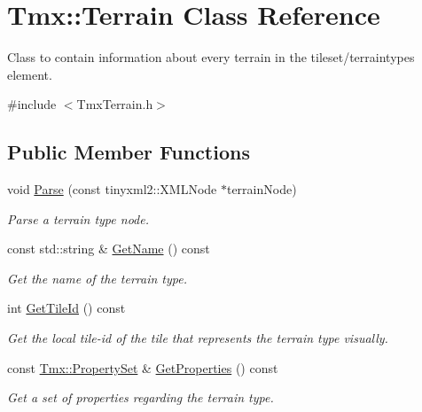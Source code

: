 \hypertarget{classTmx_1_1Terrain}{\section{Tmx\-:\-:Terrain Class Reference}
\label{classTmx_1_1Terrain}
}


Class to contain information about every terrain in the tileset/terraintypes element.  




{\ttfamily \#include $<$Tmx\-Terrain.\-h$>$}

\subsection*{Public Member Functions}
\begin{DoxyCompactItemize}
\item 
\hypertarget{classTmx_1_1Terrain_afe30f92af38023bf56adc2ae8f8e580d}{void \hyperlink{classTmx_1_1Terrain_afe30f92af38023bf56adc2ae8f8e580d}{Parse} (const tinyxml2\-::\-X\-M\-L\-Node $\ast$terrain\-Node)}\label{classTmx_1_1Terrain_afe30f92af38023bf56adc2ae8f8e580d}

\begin{DoxyCompactList}\small\item\em Parse a terrain type node. \end{DoxyCompactList}\item 
\hypertarget{classTmx_1_1Terrain_a623a166c19f3c33d7b80d3c435fdf1ac}{const std\-::string \& \hyperlink{classTmx_1_1Terrain_a623a166c19f3c33d7b80d3c435fdf1ac}{Get\-Name} () const }\label{classTmx_1_1Terrain_a623a166c19f3c33d7b80d3c435fdf1ac}

\begin{DoxyCompactList}\small\item\em Get the name of the terrain type. \end{DoxyCompactList}\item 
\hypertarget{classTmx_1_1Terrain_a20ecd6765c02f84bc51656bf0681bcb6}{int \hyperlink{classTmx_1_1Terrain_a20ecd6765c02f84bc51656bf0681bcb6}{Get\-Tile\-Id} () const }\label{classTmx_1_1Terrain_a20ecd6765c02f84bc51656bf0681bcb6}

\begin{DoxyCompactList}\small\item\em Get the local tile-\/id of the tile that represents the terrain type visually. \end{DoxyCompactList}\item 
\hypertarget{classTmx_1_1Terrain_a2bb5f2870d2e94e9c7472fc700a94ee5}{const \hyperlink{classTmx_1_1PropertySet}{Tmx\-::\-Property\-Set} \& \hyperlink{classTmx_1_1Terrain_a2bb5f2870d2e94e9c7472fc700a94ee5}{Get\-Properties} () const }\label{classTmx_1_1Terrain_a2bb5f2870d2e94e9c7472fc700a94ee5}

\begin{DoxyCompactList}\small\item\em Get a set of properties regarding the terrain type. \end{DoxyCompactList}\end{DoxyCompactItemize}


